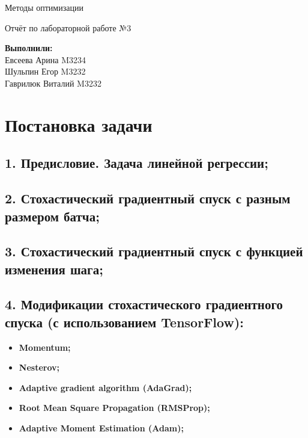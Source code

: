 \documentclass{article}
\begin{document}
\begin{titlepage}
    \bfseries 
        {\centering
            \vspace*{14em}
            \Huge Методы оптимизации\par
            \bigbreak
            Отчёт по лабораторной работе №3 \par
        }
    \vspace{20em}
    \begin{spacing}{2}
        \begin{flushright}
            {\Large \textbf{Выполнили:}}  \\
            {\large Евсеева Арина M3234} \\
            {\large Шульпин Егор M3232} \\
            {\large Гаврилюк Виталий M3232} \\ 
        \end{flushright}
    \end{spacing}
\end{titlepage}

\newpage
\section*{Постановка задачи}
\subsection*{1. Предисловие. Задача линейной регрессии;}
\subsection*{2. Стохастический градиентный спуск с разным размером батча;}
\subsection*{3. Стохастический градиентный спуск с функцией изменения шага;}
\subsection*{4. Модификации стохастического градиентного спуска (с использованием TensorFlow):}
\begin{itemize}
    \item \textbf{Momentum;}
    \item \textbf{Nesterov;}
    \item \textbf{Adaptive gradient algorithm (AdaGrad);}
    \item \textbf{Root Mean Square Propagation (RMSProp);}
    \item \textbf{Adaptive Moment Estimation (Adam);}
\end{itemize}
\end{document}
